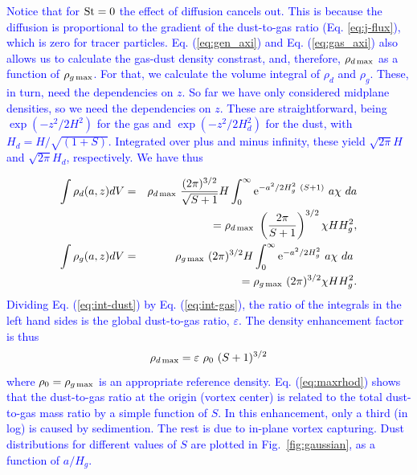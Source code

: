 \documentclass[apj]{emulateapj}
\def\blue#1{\textcolor{blue}{#1}}
\newcommand{\Eq}[1]{Eq. (\ref{#1})}
\newcommand{\eq}[1]{\Eq{#1}}
\newcommand{\eqp}[1]{(Eq. \ref{#1})}
\newcommand{\Fig}[1]{Fig.~\ref{#1}}
\newcommand{\fig}[1]{\Fig{#1}}
\newcommand{\beq}{\begin{equation}}
\newcommand{\eeq}{\end{equation}}
\newcommand{\beqn}{\begin{eqnarray}}
\newcommand{\eeqn}{\end{eqnarray}}
\newcommand{\St}{{\rm St}}
\begin{document}
\blue{
Notice that for $\St=0$ the effect of diffusion cancels out. This is because
the diffusion is proportional to the gradient of the dust-to-gas
ratio \eqp{eq:j-flux}, which is zero for tracer
particles. \eq{eq:gen_axi} and \eq{eq:gas_axi} also allows us to calculate the gas-dust
density constrast, and, therefore, $\rho_{d\,{\rm max}}$ as a function of
$\rho_{g\,{\rm max}}$. For that, we calculate the volume integral of $\rho_d$
and $\rho_g$. These, in turn, need the dependencies on $z$. So far we
have only considered midplane densities, so we need the dependencies on $z$. 
These are straightforward, being $\exp(-z^2/2H^2)$ for the gas and
$\exp(-z^2/2H_d^2)$ for the dust, with $H_d=H/\sqrt{(1+S)}$. Integrated
over plus and minus infinity, these yield $\sqrt{2\pi}H$ and
$\sqrt{2\pi}H_d$, respectively. We have thus}

\blue{
\beqn
\int\rho_d(a,z) dV  &=& \rho_{d\,{\rm max}} \ \frac{(2\pi)^{3/2}}{\sqrt{S+1}} H \int_0^\infty {\rm  e}^{-a^2/2H_g^2 \ (S+1)} \ a\chi \ da \notag\\
&&= \rho_{d\,{\rm max}} \ \left(\frac{2\pi}{S+1}\right)^{3/2} \chi H H_g^2, \label{eq:int-dust}\\ 
%
\int\rho_g(a,z) dV  &=& \rho_{g\,{\rm max}} \ (2\pi)^{3/2} H \int_0^\infty {\rm e}^{-a^2/2H_g^2} \ a\chi \ da\ \notag\\
 &&= \rho_{g\,{\rm max}} \ (2\pi)^{3/2} \chi H H_g^2. \label{eq:int-gas}\\
\eeqn 
\noindent Dividing \eq{eq:int-dust} by \eq{eq:int-gas}, the
ratio of the integrals in the left hand sides is the global dust-to-gas
ratio, $\varepsilon$. The density enhancement factor is thus 
\beq
  \rho_{d\,{\rm max}} =  \varepsilon \ \rho_0 \ (S+1)^{3/2} \label{eq:maxrhod}
\eeq where $\rho_0=\rho_{g\,{\rm max}}$ is an appropriate reference
density. \eq{eq:maxrhod} shows that the dust-to-gas ratio at the origin (vortex center)
is related to the total dust-to-gas mass ratio by a simple function of $S$.  
In this enhancement, only a third (in log) is caused by sedimention. The
rest is due to in-plane vortex capturing. Dust
distributions for different values of \blue{$S$} are plotted in \fig{fig:gaussian}, as a 
function of $a/H_g$.}
\end{document}

